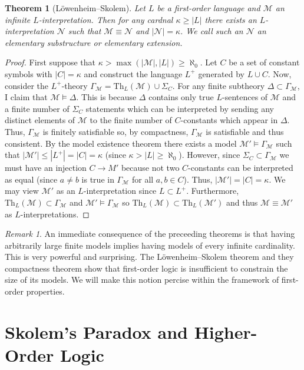 \documentclass[12pt]{article}
\newcommand{\entails}{\models}
\newcommand{\Mmod}{\mathcal{M}}
\newcommand{\Nmod}{\mathcal{N}}
\newcommand{\Th}[2]{\mathrm{Th}_{#1} \left( #2 \right)}
\theoremstyle{theorem}
\newtheorem{theorem}{Theorem}[section]
\theoremstyle{definition}
\theoremstyle{definition}
\theoremstyle{remark}
\theoremstyle{definition}
\theoremstyle{remark}
\newtheorem{remark}{Remark}[subsection]
\begin{document}
\begin{theorem}[L\"{o}wenheim–Skolem]
Let $L$ be a first-order language and $\Mmod$ an infinite $L$-interpretation. Then for any cardnal $\kappa \ge |L|$ there exists an $L$-interpretation $\Nmod$ such that $\Mmod \equiv \Nmod$ and $|\Nmod| = \kappa$. We call such an $\Nmod$ an elementary substructure or elementary extension. 
\end{theorem} 

\begin{proof}
First suppose that $\kappa > \max{(|\Mmod|, |L|)} \ge \aleph_0$. Let $C$ be a set of constant symbols with $|C| = \kappa$ and construct the language $L^+$ generated by $L \cup C$. Now, consider the $L^+$-theory $\Gamma_{\Mmod} = \Th{L}{\Mmod} \cup \Sigma_C$. For any finite subtheory $\Delta \subset \Gamma_{\Mmod}$, I claim that $\Mmod \entails \Delta$. This is because $\Delta$ contains only true $L$-sentences of $\Mmod$ and a finite number of $\Sigma_C$ statements which can be interpreted by sending any distinct elements of $\Mmod$ to the finite number of $C$-constants which appear in $\Delta$. Thus, $\Gamma_{\Mmod}$ is finitely satisfiable so, by compactness, $\Gamma_{\Mmod}$ is satisfiable and thus consistent. By the model existence theorem there exists a model $\Mmod' \entails \Gamma_{\Mmod}$ such that $|\Mmod'| \le |L^+| = |C| = \kappa$ (since $\kappa > |L| \ge \aleph_0$). However, since $\Sigma_C \subset \Gamma_{\Mmod}$ we must have an injection $C \to M'$ because not two $C$-constants can be interpreted as equal (since $a \neq b$ is true in $\Gamma_{\Mmod}$ for all $a,b \in C$). Thus, $|\Mmod'| = |C| = \kappa$. We may view $\Mmod'$ as an $L$-interpretation since $L \subset L^+$. Furthermore, $\Th{L}{\Mmod} \subset \Gamma_{\Mmod}$ and $\Mmod' \entails \Gamma_{\Mmod}$ so $\Th{L}{\Mmod} \subset \Th{L}{\Mmod'}$ and thus $\Mmod \equiv \Mmod'$ as $L$-interpretations. 
\end{proof}

\begin{remark}
An immediate consequence of the preceeding theorems is that having arbitrarily large finite models implies having models of every infinite cardinality. This is very powerful and surprising. The L\"{o}wenheim–Skolem theorem and they compactness theorem show that first-order logic is insufficient to constrain the size of its models. We will make this notion percise within the framework of first-order properties.
\end{remark}

\section{Skolem's Paradox and Higher-Order Logic}
\end{document}
